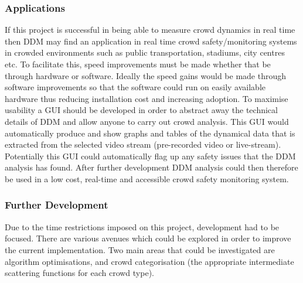 \documentclass[10pt]{article}
\begin{document}
\subsubsection{Applications}
If this project is successful in being able to measure crowd dynamics in real time then DDM may find an application in real time crowd safety/monitoring systems in crowded environments such as public transportation, stadiums, city centres etc. To facilitate this, speed improvements must be made whether that be through hardware or software. Ideally the speed gains would be made through software improvements so that the software could run on easily available hardware thus reducing installation cost and increasing adoption. To maximise usability a GUI should be developed in order to abstract away the technical details of DDM and allow anyone to carry out crowd analysis. This GUI would automatically produce and show graphs and tables of the dynamical data that is extracted from the selected video stream (pre-recorded video or live-stream). Potentially this GUI could automatically flag up any safety issues that the DDM analysis has found. After further development DDM analysis could then therefore be used in a low cost, real-time and accessible crowd safety monitoring system.

\subsubsection{Further Development}
Due to the time restrictions imposed on this project, development had to be focused. There are various avenues which could be explored in order to improve the current implementation. Two main areas that could be investigated are algorithm optimisations, and crowd categorisation (the appropriate intermediate scattering functions for each crowd type).
\end{document}
